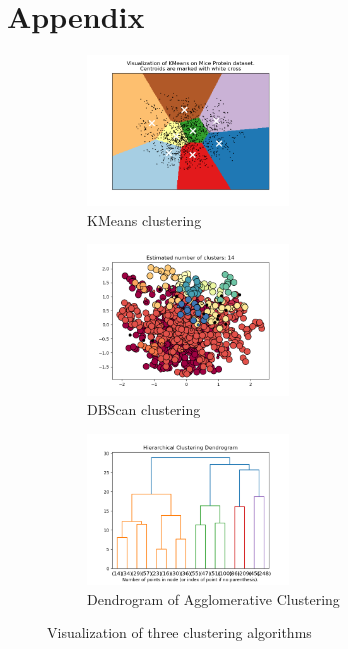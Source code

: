 \documentclass[12pt,a4paper]{article}
\begin{document}
\printbibliography


\section{Appendix}\label{sec:appendix}
\begin{figure}[htbp]
    \centering
    \begin{subfigure}{0.33\textwidth}
        \centering
        \includegraphics[width=\linewidth, height=4cm]{figures/kmeans_vis.png}
        \caption{KMeans clustering}
        \label{fig:kmeans_visualization}
    \end{subfigure}

    \hfill
    \begin{subfigure}{0.33\textwidth}
        \centering
        \includegraphics[width=\linewidth, height=4cm]{figures/dbscan_vis.png}
        \caption{DBScan clustering}
        \label{fig:dbscan_visualization}
    \end{subfigure}
    
    \hfill
    \begin{subfigure}{0.33\textwidth}
        \centering
        \includegraphics[width=\linewidth, height=4cm]{figures/dendrogram_vis.png}
        \caption{Dendrogram of Agglomerative Clustering}
        \label{fig:dendrogram_distribution}
    \end{subfigure}
    \caption{Visualization of three clustering algorithms}
    \label{fig:clustering_visualization}
\end{figure}
\end{document}

